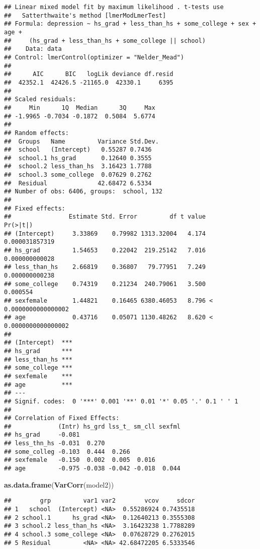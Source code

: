 \documentclass[]{article}
\newenvironment{Shaded}{\begin{snugshade}}{\end{snugshade}}
\newcommand{\KeywordTok}[1]{\textcolor[rgb]{0.13,0.29,0.53}{\textbf{#1}}}
\newcommand{\NormalTok}[1]{#1}
\begin{document}
\begin{verbatim}
## Linear mixed model fit by maximum likelihood . t-tests use
##   Satterthwaite's method [lmerModLmerTest]
## Formula: depression ~ hs_grad + less_than_hs + some_college + sex + age +  
##     (hs_grad + less_than_hs + some_college || school)
##    Data: data
## Control: lmerControl(optimizer = "Nelder_Mead")
## 
##      AIC      BIC   logLik deviance df.resid 
##  42352.1  42426.5 -21165.0  42330.1     6395 
## 
## Scaled residuals: 
##     Min      1Q  Median      3Q     Max 
## -1.9965 -0.7034 -0.1872  0.5084  5.6774 
## 
## Random effects:
##  Groups   Name         Variance Std.Dev.
##  school   (Intercept)   0.55287 0.7436  
##  school.1 hs_grad       0.12640 0.3555  
##  school.2 less_than_hs  3.16423 1.7788  
##  school.3 some_college  0.07629 0.2762  
##  Residual              42.68472 6.5334  
## Number of obs: 6406, groups:  school, 132
## 
## Fixed effects:
##                Estimate Std. Error         df t value             Pr(>|t|)
## (Intercept)     3.33869    0.79982 1313.32004   4.174       0.000031857319
## hs_grad         1.54653    0.22042  219.25142   7.016       0.000000000028
## less_than_hs    2.66819    0.36807   79.77951   7.249       0.000000000238
## some_college    0.74319    0.21234  240.79061   3.500             0.000554
## sexfemale       1.44821    0.16465 6380.46053   8.796 < 0.0000000000000002
## age             0.43716    0.05071 1130.48262   8.620 < 0.0000000000000002
##                 
## (Intercept)  ***
## hs_grad      ***
## less_than_hs ***
## some_college ***
## sexfemale    ***
## age          ***
## ---
## Signif. codes:  0 '***' 0.001 '**' 0.01 '*' 0.05 '.' 0.1 ' ' 1
## 
## Correlation of Fixed Effects:
##             (Intr) hs_grd lss_t_ sm_cll sexfml
## hs_grad     -0.081                            
## less_thn_hs -0.031  0.270                     
## some_colleg -0.103  0.444  0.266              
## sexfemale   -0.150  0.002  0.005  0.016       
## age         -0.975 -0.038 -0.042 -0.018  0.044
\end{verbatim}

\begin{Shaded}
\begin{Highlighting}[]
\KeywordTok{as.data.frame}\NormalTok{(}\KeywordTok{VarCorr}\NormalTok{(model2))}
\end{Highlighting}
\end{Shaded}

\begin{verbatim}
##        grp         var1 var2        vcov     sdcor
## 1   school  (Intercept) <NA>  0.55286924 0.7435518
## 2 school.1      hs_grad <NA>  0.12640213 0.3555308
## 3 school.2 less_than_hs <NA>  3.16423238 1.7788289
## 4 school.3 some_college <NA>  0.07628729 0.2762015
## 5 Residual         <NA> <NA> 42.68472205 6.5333546
\end{verbatim}
\end{document}
